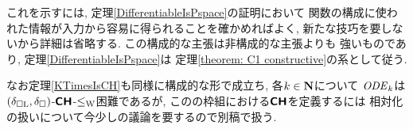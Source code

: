 これを示すには, 
定理\ref{DifferentiableIsPspace}の証明において
関数の構成に使われた情報が入力から容易に得られることを確かめればよく, 
新たな技巧を要しないから詳細は省略する. 
この構成的な主張は非構成的な主張よりも
強いものであり\cite[補題3.7, 3.8]{kawamura2010operators}, 
定理\ref{DifferentiableIsPspace}は
定理\ref{theorem: C1 constructive}の系として従う. 


なお定理\ref{KTimesIsCH}も同様に構成的な形で成立ち, 
各$k \in \mathbf N$について
$\mathit{ODE} _k$は$(\delta _{\square \mathrm L}, \delta _\square)$-$\text{\bfseries \sffamily \upshape CH}$-$\leq _{\mathrm W}$困難であるが, 
この\cite{kawamura2010operators}の枠組における$\text{\bfseries \sffamily \upshape CH}$を定義するには
相対化の扱いについて今少しの議論を要するので別稿で扱う. 


